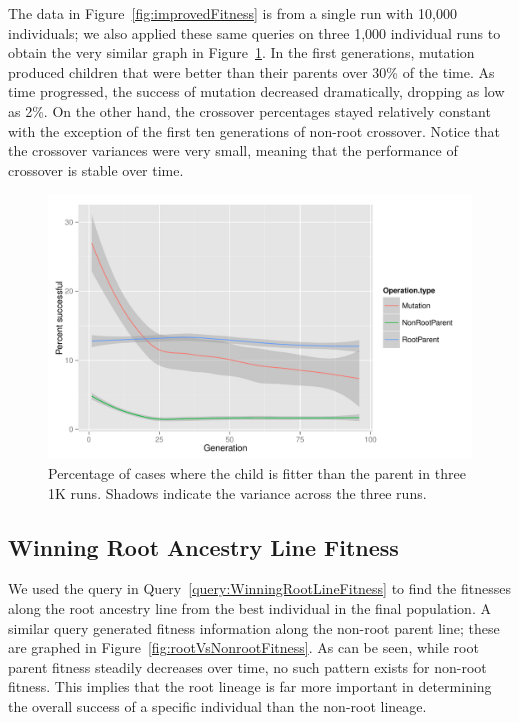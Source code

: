 \documentclass[12pt]{article}
\begin{document}
The data in Figure~\ref{fig:improvedFitness} is from a single run with 10,000 individuals; we also applied these same queries on three 1,000 individual runs to obtain the very similar graph in Figure~\ref{fig:improvedFitness1K}. In the first generations, mutation produced children that were better than their parents over 30\% of the time. As time progressed, the success of mutation decreased dramatically, dropping as low as 2\%. On the other hand, the crossover percentages stayed relatively constant with the exception of the first ten generations of non-root crossover. Notice that the crossover variances were very small, meaning that the performance of crossover is stable over time. 

\begin{figure}[p]
 \centering
 \includegraphics[height=0.63\textwidth]{Percent_successful_Axiom_1K_runs}
 \caption{Percentage of cases where the child is fitter than the parent in three 1K runs. Shadows indicate the variance across the three runs.}
 \label{fig:improvedFitness1K}
\end{figure}

\subsection{Winning Root Ancestry Line Fitness}
\label{sec:WinningRootLineFitness}

We used the query in Query~\ref{query:WinningRootLineFitness} to find the fitnesses along the root ancestry line from the best individual in the final population. A similar query generated fitness information along the non-root parent line; these are graphed in Figure~\ref{fig:rootVsNonrootFitness}. As can be seen, while root parent fitness steadily decreases over time, no such pattern exists for non-root fitness. This implies that the root lineage is far more important in determining the overall success of a specific individual than the non-root lineage.
\end{document}
